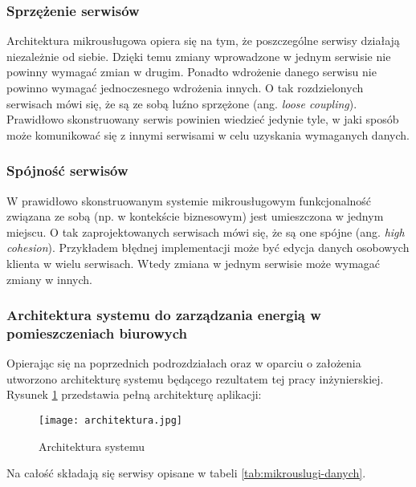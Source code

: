 \subsubsection{Sprzężenie serwisów}

Architektura mikrousługowa opiera się na tym, że poszczególne serwisy działają 
niezależnie od siebie. Dzięki temu zmiany wprowadzone w jednym serwisie nie powinny 
wymagać zmian w drugim. Ponadto wdrożenie danego serwisu nie powinno wymagać 
jednoczesnego wdrożenia innych. O tak rozdzielonych serwisach mówi się, że są ze sobą 
luźno sprzężone (ang. \textit{loose coupling}). Prawidłowo skonstruowany serwis powinien 
wiedzieć jedynie tyle, w jaki sposób może komunikować się z innymi serwisami w celu 
uzyskania wymaganych danych.

\subsubsection{Spójność serwisów}
W prawidłowo skonstruowanym systemie mikrousługowym funkcjonalność związana ze 
sobą (np. w kontekście biznesowym) jest umieszczona w jednym miejscu. O tak 
zaprojektowanych serwisach mówi się, że są one spójne (ang. \textit{high cohesion}). 
Przykładem 
błędnej implementacji może być edycja danych osobowych klienta w wielu serwisach. 
Wtedy zmiana w jednym serwisie może wymagać zmiany w innych.

\subsubsection{Architektura systemu do zarządzania energią w pomieszczeniach biurowych}

Opierając się na poprzednich podrozdziałach oraz w oparciu o założenia utworzono 
architekturę systemu będącego rezultatem tej pracy inżynierskiej. Rysunek 
\ref{fig:architektura-systemu} przedstawia pełną architekturę aplikacji:

\begin{figure}[h]
    \centering
    \texttt{[image: architektura.jpg]}
    \caption{Architektura systemu}
    \label{fig:architektura-systemu}
\end{figure}

Na całość składają się serwisy opisane w tabeli \ref{tab:mikrouslugi-danych}.

